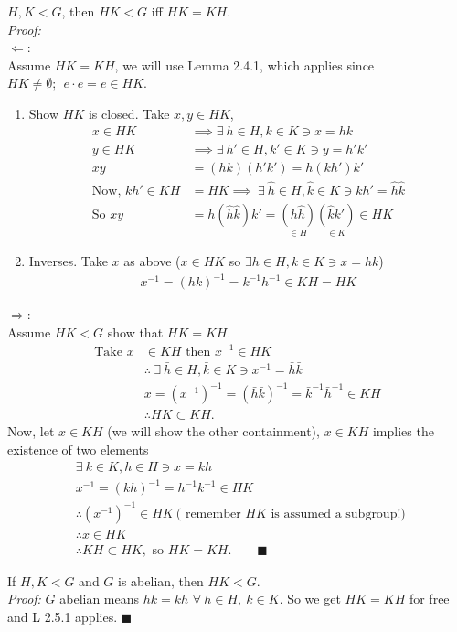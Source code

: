 \begin{lemma}
$H,K < G$, then $HK < G$ iff $HK=KH$. \steezybreak\\
\textit{Proof:} \\
$\Leftarrow :$ \\
Assume $HK=KH$, we will use Lemma 2.4.1, which applies since $HK\neq \emptyset; \ \ e\cdot e = e\in HK$.
\begin{enumerate}
    \item Show $HK$ is closed. Take $x,y\in HK$,
    \begin{align}
        x\in HK &\implies \exists \ h \in H, k\in K \ni x=hk \nonumber \\
        y\in HK &\implies \exists \ h' \in H, k'\in K \ni y=h'k' \nonumber \\
        xy&=(hk)(h'k')=h(kh')k' \nonumber \\
        \text{Now, } kh'\in KH&=HK\implies \ \exists \ \hat{h}\in H, \hat{k}\in K \ni kh'=\hat{h}\hat{k} \nonumber \\
        \text{So } xy&=h(\hat{h}\hat{k})k'= \underset{\in H}{(h\hat{h})}\underset{\in K}{(\hat{k} k')} \in HK \nonumber
    \end{align}
    \item Inverses. Take $x$ as above ($x \in HK$ so $\exists h \in H, k\in K \ni x=hk$) \\
    \begin{align}
        x^{-1}=(hk)^{-1}=k^{-1}h^{-1}\in KH = HK \nonumber
    \end{align}
\end{enumerate}
$\Rightarrow :$ \\
Assume $HK<G$ show that $HK=KH$.
\begin{align}
    \text{Take }x &\in KH \text{ then }x^{-1}\in HK \nonumber\\
    &\therefore \ \exists \ \bar{h} \in H, \bar{k}\in K \ni x^{-1}=\bar{h}\bar{k} \nonumber \\
    &x=(x^{-1})^{-1}=(\bar{h}\bar{k})^{-1}=\bar{k}^{-1}\bar{h}^{-1}\in KH \nonumber \\
    &\therefore HK \subset KH. \nonumber
\end{align}
Now, let $x\in KH$ (we will show the other containment), $x\in KH$ implies the existence of two elements
\begin{align}
    &\exists \ k \in K, h \in H \ni x= kh \nonumber\\
    &x^{-1}= (kh)^{-1}=h^{-1}k^{-1}\in HK \nonumber \\
    &\therefore (x^{-1})^{-1} \in HK \ \text{( remember $HK$ is assumed a subgroup!) } \nonumber \\
    &\therefore x \in HK \nonumber \\
    &\therefore KH\subset HK, \text{ so } HK=KH. \ \ \ \ \ \ \ \ \ \blacksquare \nonumber
\end{align}
\end{lemma}
\setcounter{dummy_lemma}{0}
\begin{corollary}
If $H,K < G$ and $G$ is abelian, then $HK<G$.\\
\textit{Proof:}
$G$ abelian means $hk=kh$ $\forall \ h\in H, \ k\in K$. So we get $HK=KH$ for free and L 2.5.1 applies. $\blacksquare$
\end{corollary}

